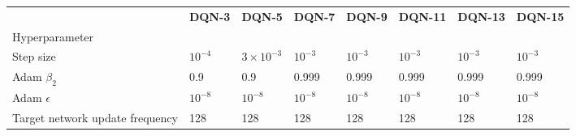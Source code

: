 \begin{tabular}{llllllll}
 & \bfseries DQN-3 & \bfseries DQN-5 & \bfseries DQN-7 & \bfseries DQN-9 & \bfseries DQN-11 & \bfseries DQN-13 & \bfseries DQN-15 \\
Hyperparameter &  &  &  &  &  &  &  \\
Step size & $10^{-4}$ & $3 \times 10^{-3}$ & $10^{-3}$ & $10^{-3}$ & $10^{-3}$ & $10^{-3}$ & $10^{-3}$ \\
Adam $\beta_2$ & 0.9 & 0.9 & 0.999 & 0.999 & 0.999 & 0.999 & 0.999 \\
Adam $\epsilon$ & $10^{-8}$ & $10^{-8}$ & $10^{-8}$ & $10^{-8}$ & $10^{-8}$ & $10^{-8}$ & $10^{-8}$ \\
Target network update frequency & 128 & 128 & 128 & 128 & 128 & 128 & 128 \\
\end{tabular}
